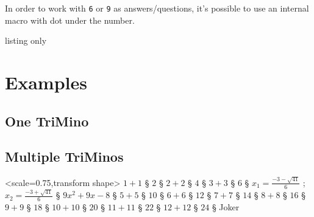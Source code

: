 \documentclass[11pt,a4paper]{ltxdoc}
\begin{document}
In order to work with \texttt{6} or \texttt{9} as answers/questions, it's possible to use an internal macro with dot under the number.

\begin{DemoCode}{listing only}
\end{DemoCode}

\begin{DemoCode}{}
\end{DemoCode}

\pagebreak

\section{Examples}

\subsection{One TriMino}

\begin{DemoCode}{}
\end{DemoCode}

\begin{DemoCode}{}
\end{DemoCode}

\subsection{Multiple TriMinos}

\begin{DemoCode}{}
\tkztriminos%
	[size=5cm,showiconlogo,bgcolor=orange!15,font=\large,decocolor=purple,%
	iconlogo={\scalebox{2.15}[2.15]{\textcolor{blue!75!black}{\faPuzzlePiece}}}]%
	<scale=0.75,transform shape>%
	{%
	$1+1$ § $2$ §
	$2+2$ § $4$ §
	$3+3$ § $6$ §
	{$x_{1}=\frac{-3-\sqrt{41}}{6}$ ; $x_{2}=\frac{-3+\sqrt{41}}{6}$} § $9x^{2}+9x-8$ §
	$5+5$ § $10$ §
	$6+6$ § $12$ §
	$7+7$ § $14$ §
	$8+8$ § $16$ §
	$9+9$ § $18$ §
	$10+10$ § $20$ §
	$11+11$ § $22$ §
	$12+12$ § $24$ §
	Joker
}
\end{DemoCode}

\pagebreak
\end{document}
